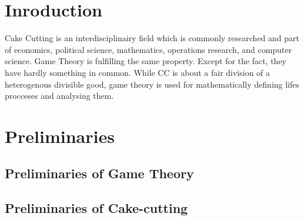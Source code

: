 


\section{Inroduction}
Cake Cutting is an interdisciplinairy field which is commonly researched and part of economics, political science, mathematics, operations research, and computer science. Game Theory is fulfilling the same property. Except for the fact, they have hardly something in common. While CC is about a fair division of a heterogenous divisible good, game theory is used for mathematically defining lifes procceses and analysing them.
\pagebreak

\section{Preliminaries}
\subsection{Preliminaries of Game Theory}
\newpage
\subsection{Preliminaries of Cake-cutting}
